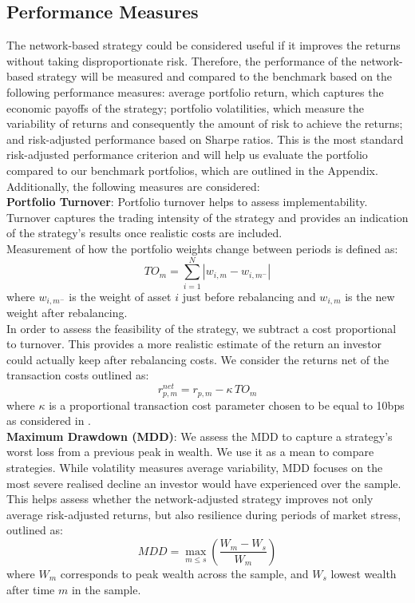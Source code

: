 \documentclass[11pt]{article}
\begin{document}
\subsection{Performance Measures}
The network-based strategy could be considered useful if it improves the returns without taking disproportionate risk. Therefore, the performance of the network-based strategy will be measured and compared to the benchmark based on the following performance measures: average portfolio return, which captures the economic payoffs of the strategy; portfolio volatilities, which measure the variability of returns and consequently the amount of risk to achieve the returns; and risk-adjusted performance based on Sharpe ratios. This is the most standard risk-adjusted performance criterion and will help us evaluate the portfolio compared to our benchmark portfolios, which are outlined in the Appendix.  Additionally, the following measures are considered:\\
\textbf{Portfolio Turnover}:
Portfolio turnover helps to assess implementability. Turnover captures the trading intensity of the strategy and provides an indication of the strategy's results once realistic costs are included. \\
Measurement of how the portfolio weights change between periods is defined as:
\begin{equation}
TO_m =\sum_{i=1}^{N}\left|w_{i,m} - w_{i,m^-}\right|
\end{equation}
where $w_{i,m^-}$ is the weight of asset $i$ just before rebalancing and $w_{i,m}$ is the new weight after rebalancing. \\
In order to assess the feasibility of the strategy, we subtract a cost proportional to turnover. This provides a more realistic estimate of the return an investor could actually keep after rebalancing costs. We consider the returns net of the transaction costs outlined as:
\begin{equation}
r^{net}_{p,m} =r_{p,m} - \kappa \, TO_m
\end{equation}
where $\kappa $ is a proportional transaction cost parameter chosen to be equal to 10bps as considered in \cite{frazzini2018tradingcosts}.  \\
\textbf{Maximum Drawdown (MDD)}:
We assess the MDD to capture a strategy’s worst loss from a previous peak in wealth. We use it as a mean to compare strategies. While volatility measures average variability, MDD focuses on the most severe realised decline an investor would have experienced over the sample. This helps assess whether the network-adjusted strategy improves not only average risk-adjusted returns, but also resilience during periods of market stress, outlined as:
\begin{equation}
    MDD = \max_{m \le s} \left( \frac{W_{m}- W_{s}}{W_{m}}\right)
\end{equation}
where $W_{m}$ corresponds to peak wealth across the sample, and $W_{s}$ lowest wealth after time $m$ in the sample.
\end{document}
